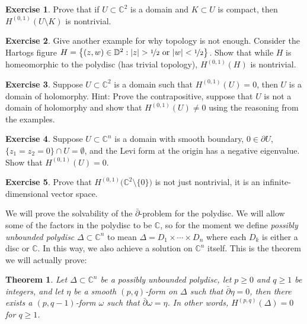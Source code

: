 \documentclass[12pt,openany]{book}
\newcommand{\sabs}[1]{\lvert {#1} \rvert}
\newcommand{\C}{{\mathbb{C}}}
\newcommand{\D}{{\mathbb{D}}}
\newcommand{\myindex}[1]{#1\index{#1}}
\theoremstyle{plain}
\newtheorem{thm}{Theorem}[section]
\theoremstyle{remark}
\theoremstyle{definition}
\newenvironment{exbox}{%
    \def\FrameCommand{\vrule width 1pt \relax\hspace{10pt}}%
    \MakeFramed{\advance\hsize-\width\FrameRestore}%
}{%
    \endMakeFramed
}
\theoremstyle{exercise}
\newtheorem{exercise}{Exercise}[section]
\theoremstyle{example}
\begin{document}
\begin{exbox}
\begin{exercise}
Prove that if $U \subset \C^2$ is a domain and $K \subset U$ is compact,
then $H^{(0,1)}(U \setminus K)$ is nontrivial.
\end{exercise}

\begin{exercise}
Give another example for why topology is not enough.  Consider the
Hartogs figure
$H =
\bigl\{ (z,w) \in \D^{2} : \sabs{z} > \nicefrac{1}{2} \text{ or }
\sabs{w} < \nicefrac{1}{2}
\bigr\}$.
Show that while $H$ is homeomorphic to the polydisc (has trivial topology),
$H^{(0,1)}(H)$ is nontrivial.
\end{exercise}

\begin{exercise}
Suppose $U \subset \C^2$ is a domain such that $H^{(0,1)}(U) = 0$,
then $U$ is a domain of holomorphy.
Hint: Prove the contrapositive, suppose that $U$ is not a domain of
holomorphy and show that $H^{(0,1)}(U) \not= 0$ using the reasoning from
the examples.
\end{exercise}

\begin{exercise} \label{exercise:Levinegdol}
Suppose $U \subset \C^n$ is a domain with smooth boundary,
$0 \in \partial U$, $\{ z_1=z_2 =0\} \cap U = \emptyset$, and the Levi form
at the origin has a negative eigenvalue.  Show that
$H^{(0,1)}(U) = 0$.
\end{exercise}

\begin{exercise}
Prove that $H^{(0,1)}\bigl(\C^2 \setminus \{ 0 \} \bigr)$ is not just
nontrivial, it is an infinite-dimensional vector space.
\end{exercise}
\end{exbox}

We will prove the solvability of the $\bar{\partial}$-problem for the
polydisc.
We will allow some of the factors in the polydisc to be $\C$,
so for the moment we define \emph{\myindex{possibly unbounded polydisc}}
$\Delta \subset \C^n$
to mean $\Delta = D_1 \times \cdots \times D_n$ where
each $D_k$ is either a disc or $\C$.  In this way, we also achieve a
solution on $\C^n$ itself.  This is the theorem we will actually prove:

\begin{thm} \label{thm:dbaronpoly}
Let $\Delta \subset \C^n$ be a possibly unbounded polydisc,
let $p \geq 0$ and $q \geq 1$ be integers, and
let $\eta$ be a smooth $(p,q)$-form on $\Delta$ such that
$\bar{\partial} \eta = 0$, then there exists a $(p,q-1)$-form $\omega$
such that $\bar{\partial} \omega = \eta$.
In other words, $H^{(p,q)}(\Delta) = 0$ for $q \geq 1$.
\end{thm}
\end{document}
